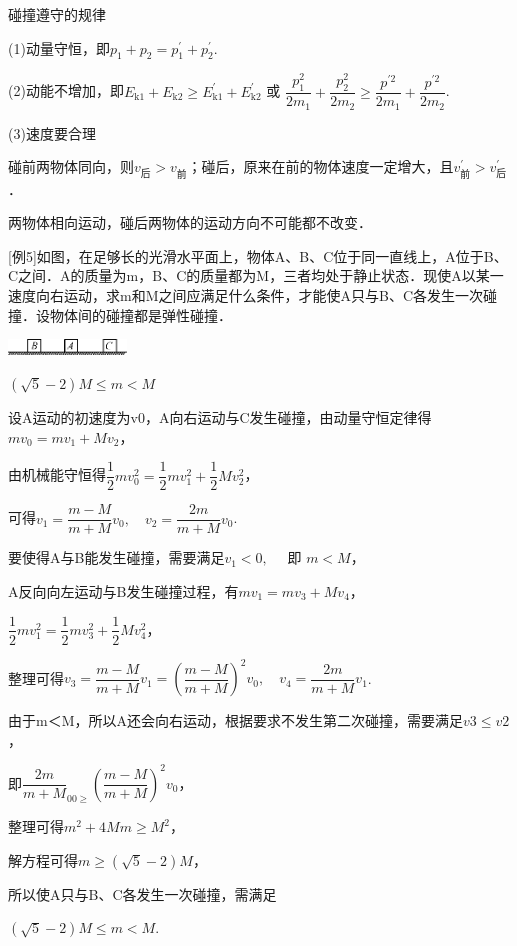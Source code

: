 碰撞遵守的规律

(1)动量守恒，即$p_{1}+p_{2}=p_{1}^{\prime}+p_{2}^{\prime}$.

(2)动能不增加，即$E_{\mathrm{k} 1}+E_{\mathrm{k} 2} \geq E_{\mathrm{k} 1}^{\prime}+E_{\mathrm{k} 2}^{\prime}$ 或 $\dfrac{p_{1}^{2}}{2 m_{1}}+\dfrac{p_{2}^{2}}{2 m_{2}} \geq \dfrac{p^{\prime 2}}{2 m_{1}}+\dfrac{p^{\prime 2}}{2 m_{2}}$.　

(3)速度要合理

碰前两物体同向，则$v_{\text{后}}>v_{\text{前}}$；碰后，原来在前的物体速度一定增大，且$v_{\text{前}}^\prime>v_{\text{后}}^\prime$．

两物体相向运动，碰后两物体的运动方向不可能都不改变．

{[}例5{]}如图，在足够长的光滑水平面上，物体A、B、C位于同一直线上，A位于B、C之间．A的质量为m，B、C的质量都为M，三者均处于静止状态．现使A以某一速度向右运动，求m和M之间应满足什么条件，才能使A只与B、C各发生一次碰撞．设物体间的碰撞都是弹性碰撞．

\begin{center}\includegraphics[width=1.23611in,height=0.17014in]{media/image252.png}\end{center}
\begin{solution}$(\sqrt{5}-2) M \leq m<M$

	设A运动的初速度为v0，A向右运动与C发生碰撞，由动量守恒定律得$m v_{0}=m v_{1}+M v_{2}$，

由机械能守恒得$\dfrac{1}{2} m v_{0}^{2}=\dfrac{1}{2} m v_{1}^{2}+\dfrac{1}{2} M v_{2}^{2}$，

可得$v_{1}=\dfrac{m-M}{m+M} v_{0}, \quad v_{2}=\dfrac{2 m}{m+M} v_{0}$.

要使得A与B能发生碰撞，需要满足$v_{1}<0, \quad$ 即 $m<M$，

A反向向左运动与B发生碰撞过程，有$m v_{1}=m v_{3}+M v_{4}$，

$\dfrac{1}{2} m v_{1}^{2}=\dfrac{1}{2} m v_{3}^{2}+\dfrac{1}{2} M v_{4}^{2}$，

整理可得$v_{3}=\dfrac{m-M}{m+M} v_{1}=\left(\dfrac{m-M}{m+M}\right)^{2} v_{0}, \quad v_{4}=\dfrac{2 m}{m+M} v_{1}$.

由于m＜M，所以A还会向右运动，根据要求不发生第二次碰撞，需要满足$v3\leq v2$，

即$\dfrac{2 m}{m+M}_{00 \geq}\left(\dfrac{m-M}{m+M}\right)^{2} v_{0}$，

整理可得$m^{2}+4 M m \geq M^{2}$，

解方程可得$m \geq(\sqrt{5}-2) M$，

所以使A只与B、C各发生一次碰撞，需满足

$(\sqrt{5}-2) M \leq m<M$.
\end{solution}


